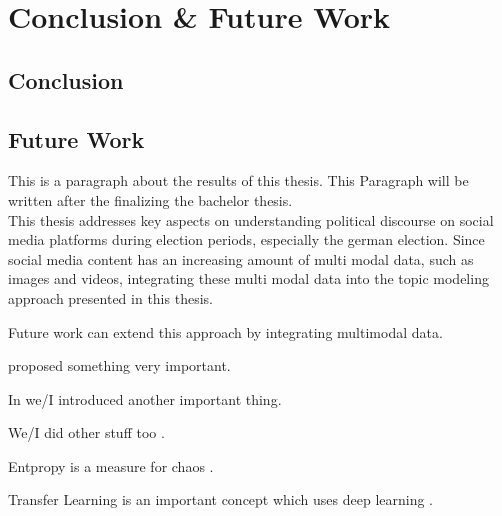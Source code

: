
\chapter{Conclusion \& Future Work}\label{ch:background}

\minitoc

\section{Conclusion}

\lipsum[1-3]

\section{Future Work}

This is a paragraph about the results of this thesis. This Paragraph will be written after the finalizing the bachelor thesis.\\
This thesis addresses key aspects on understanding political discourse on social media platforms during election periods, especially the german election.
Since social media content has an increasing amount of multi modal data, such as images and videos, integrating these multi modal data into the topic modeling approach presented in this thesis.

Future work can extend this approach by integrating multimodal data. 

\citet{sowa-2000-knowledgerepr} proposed something very important.

In \citep{turing-1948-intelligentmachinery} we/I introduced another important thing.

We/I did other stuff too \citep{turing-1950-computingmachinery}.


Entpropy is a measure for chaos \cite{shannon-1948-entropy}.

Transfer Learning is an important concept \cite{ruder-2019-phdthesis,ruder-2019-transferlearning} which uses deep learning \citep{goodfellow-2016-dlbook}.

